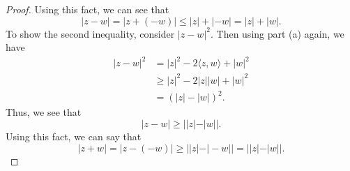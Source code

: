 \documentclass[a4paper]{article}
\begin{document}
\begin{enumerate}
\begin{proof}
Using this fact, we can see that 
\[  | z - w  |  = | z + (-w) | \leq | z  |  + | -w | = |  z  |  + | w |.  \]
To show the second inequality, consider \( | z - w  |^{2} \). Then using part (a) again, we have
\begin{align*}
    | z - w  |^{2} &= | z |^{2} - 2 \langle z , w \rangle + | w  |^{2} \\
                   & \geq | z |^{2} - 2 | z | | w |  + | w |^{2} \\ 
                   &= (| z |  - | w |)^{2}. 
\end{align*}
Thus, we see that  
\[  | z - w  | \geq |  | z  |  - | w |  |.  \]
Using this fact, we can say that 
\[  | z + w  |  = | z - (-w) | \geq | | z  |  - | -w |  | = | | z  |  - | w |  |. \]
                \end{proof}
        \end{enumerate}
\end{document}
